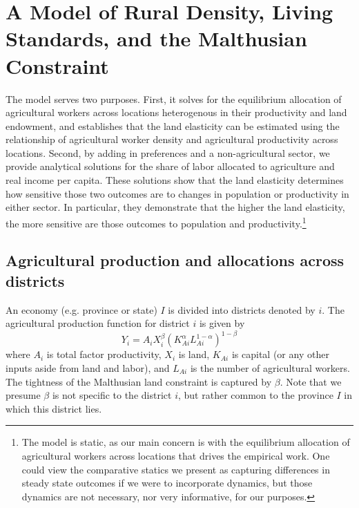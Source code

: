 \documentclass[11pt]{article}
\begin{document}
\section{A Model of Rural Density, Living Standards, and the Malthusian Constraint}\label{SEC_agmodel}
The model serves two purposes. First, it solves for the equilibrium allocation of agricultural workers across locations heterogenous in their productivity and land endowment, and establishes that the land elasticity can be estimated using the relationship of agricultural worker density and agricultural productivity across locations. Second, by adding in preferences and a non-agricultural sector, we provide analytical solutions for the share of labor allocated to agriculture and real income per capita. These solutions show that the land elasticity determines how sensitive those two outcomes are to changes in population or productivity in either sector. In particular, they demonstrate that the higher the land elasticity, the more sensitive are those outcomes to population and productivity.\footnote{The model is static, as our main concern is with the equilibrium allocation of agricultural workers across locations that drives the empirical work. One could view the comparative statics we present as capturing differences in steady state outcomes if we were to incorporate dynamics, but those dynamics are not necessary, nor very informative, for our purposes.}

\subsection{Agricultural production and allocations across districts}
An economy (e.g. province or state) $I$ is divided into districts denoted by $i$. The agricultural production function for district $i$ is given by 
\begin{equation}
Y_{i} = A_{i} X_{i}^{\beta} \left(K_{Ai}^{\alpha}L_{Ai}^{1-\alpha}\right)^{1-\beta} \label{EQ_production}
\end{equation}
where $A_{i}$ is total factor productivity, $X_{i}$ is land, $K_{Ai}$ is capital (or any other inputs aside from land and labor), and $L_{Ai}$ is the number of agricultural workers. The tightness of the Malthusian land constraint is captured by $\beta$. Note that we presume $\beta$ is not specific to the district $i$, but rather common to the province $I$ in which this district lies.
\end{document}
